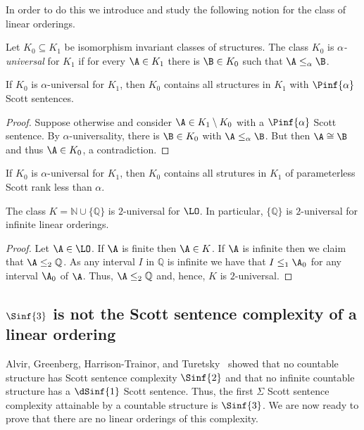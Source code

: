 \documentclass{amsart}
\newcommand{\Q}{\mathbb{Q}}
\begin{document}
In order to do this we introduce and study the following notion for the class of
linear orderings.
\begin{definition}\label{def:alphauniversality}
  Let $K_0\subseteq K_1$ be isomorphism invariant classes of structures. The
  class $K_0$ is \emph{$\alpha$-universal} for $K_1$ if for every $\A\in K_1$
  there is $\B\in K_0$ such that $\A\leq_\alpha\B$. 
\end{definition}
\begin{lemma}\label{lem:universalrankinvariant}
  If $K_0$ is $\alpha$-universal for $K_1$, then $K_0$ contains all structures
  in $K_1$ with $\Pinf{\alpha}$ Scott sentences.
\end{lemma}
\begin{proof}
  Suppose otherwise and consider $\A\in K_1\setminus K_0$ with a $\Pinf{\alpha}$
  Scott sentence. By $\alpha$-universality, there is $\B\in K_0$ with
  $\A\leq_\alpha\B$. But then $\A\cong \B$ and thus $\A\in K_0$, a
  contradiction.
\end{proof}
\begin{corollary}
  If $K_0$ is $\alpha$-universal for $K_1$, then $K_0$ contains all strutures in
  $K_1$ of parameterless Scott rank less than $\alpha$.
\end{corollary}
\begin{lemma}\label{lem:universal}
  The class $K=\mathbb N\cup\{\Q\}$ is $2$-universal for $\LO$. In particular,
  $\{\Q\}$ is $2$-universal for infinite linear orderings.
\end{lemma}
\begin{proof}
  Let $\A\in \LO$. If $\A$ is finite then $\A\in K$. If
  $\A$ is infinite then we claim that $\A\leq_2\Q$. As any interval $I$ in
  $\Q$ is infinite we have that $I\leq_1\A_0$ for any interval $\A_0$ of $\A$.
  Thus, $\A\leq_2\Q$ and, hence, $K$ is $2$-universal.
\end{proof}
\subsection{$\Sinf{3}$ is not the Scott sentence complexity of a linear
ordering}\label{sec:notssc}
Alvir, Greenberg, Harrison-Trainor, and Turetsky~\cite{alvir2021} showed that no countable
structure has Scott sentence complexity $\Sinf{2}$ and that no
infinite countable structure has a $\dSinf{1}$ Scott sentence. Thus, the first $\Sigma$ Scott sentence complexity
attainable by a countable structure is $\Sinf{3}$. We are now ready to prove
that there are no linear orderings of this complexity.
\end{document}
